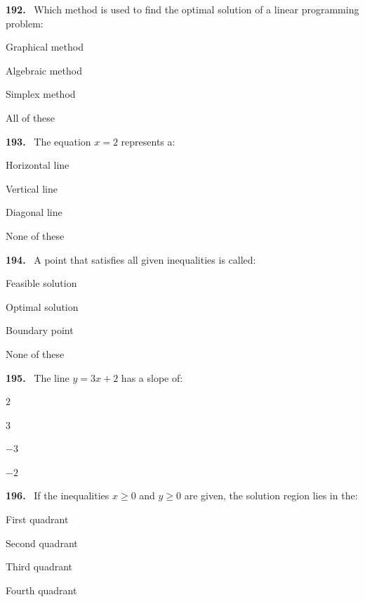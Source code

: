 \documentclass[11pt]{article}
\newenvironment{qenv}[1]{%
  \par\medskip\noindent\textbf{#1.}\ \ignorespaces
}{\par}
\begin{document}
\begin{qenv}{192} Which method is used to find the optimal solution of a linear programming problem:
\begin{options} \item Graphical method \item Algebraic method \item Simplex method \item All of these \end{options} \end{qenv}

\begin{qenv}{193} The equation $x=2$ represents a:
\begin{options} \item Horizontal line \item Vertical line \item Diagonal line \item None of these \end{options} \end{qenv}

\begin{qenv}{194} A point that satisfies all given inequalities is called:
\begin{options} \item Feasible solution \item Optimal solution \item Boundary point \item None of these \end{options} \end{qenv}

\begin{qenv}{195} The line $y=3x+2$ has a slope of:
\begin{options} \item $2$ \item $3$ \item $-3$ \item $-2$ \end{options} \end{qenv}

\begin{qenv}{196} If the inequalities $x\geq 0$ and $y\geq 0$ are given, the solution region lies in the:
\begin{options} \item First quadrant \item Second quadrant \item Third quadrant \item Fourth quadrant \end{options} \end{qenv}
\end{document}
